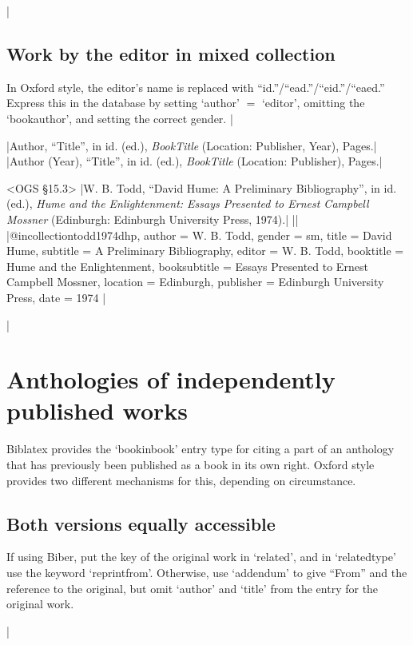 \documentclass[extrafontsizes,11pt,a4paper,oneside]{memoir}
\newcommand*{\lit}[1]{\textsf{#1}}
\newcommand*{\code}[1]{`\textsf{#1}'}
\begin{document}
\todoc|
\subsection{Work by the editor in mixed collection}

In Oxford style, the editor's name is replaced with \enquote{id.}\slash \enquote{ead.}\slash \enquote{eid.}\slash \enquote{eaed.} Express this in the database by setting \code{author} $=$ \code{editor}, omitting the \code{bookauthor}, and setting the correct gender.
|

\specs
|Author, \enquote{Title}, \lit{in id.} (\lit{ed.}), \emph{BookTitle} (Location: Publisher, Year), Pages.|%
|Author (Year), \enquote{Title}, \lit{in id.} (\lit{ed.}), \emph{BookTitle} (Location: Publisher), Pages.|

\bibexample<OGS \S15.3>
|W. B. Todd, \enquote{David Hume: A Preliminary Bibliography}, in id. (ed.), \emph{Hume and the Enlightenment: Essays Presented to Ernest Campbell Mossner} (Edinburgh: Edinburgh University Press, 1974).|%
||%
|@incollection{todd1974dhp,
  author = {W. B. Todd},
  gender = {sm},
  title = {David Hume},
  subtitle = {A Preliminary Bibliography},
  editor = {W. B. Todd},
  booktitle = {Hume and the Enlightenment},
  booksubtitle = {Essays Presented to Ernest Campbell Mossner},
  location = {Edinburgh},
  publisher = {Edinburgh University Press},
  date = {1974}
}|

\todoc|
\section{Anthologies of independently published works}

Biblatex provides the \code{bookinbook} entry type for citing a part of an anthology that has previously been published as a book in its own right. Oxford style provides two different mechanisms for this, depending on circumstance.

\subsection{Both versions equally accessible}

If using Biber, put the key of the original work in \code{related}, and in \code{relatedtype} use the keyword \code{reprintfrom}. Otherwise, use \code{addendum} to give \enquote{From} and the reference to the original, but omit \code{author} and \code{title} from the entry for the original work.

|
\end{document}
